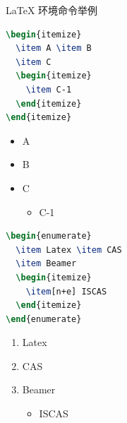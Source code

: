 \documentclass{beamer}
\begin{document}
\begin{frame}[fragile]{\LaTeX{} 环境命令举例}
    \begin{minipage}{0.5\linewidth}
\begin{lstlisting}[language=TeX]
\begin{itemize}
  \item A \item B
  \item C
  \begin{itemize}
    \item C-1
  \end{itemize}
\end{itemize}
\end{lstlisting}
    \end{minipage}\hspace{1cm}
    \begin{minipage}{0.3\linewidth}
        \begin{itemize}
            \item A
            \item B
            \item C
            \begin{itemize}
                \item C-1
            \end{itemize}
        \end{itemize}
    \end{minipage}
    \medskip
    \pause
    \begin{minipage}{0.5\linewidth}
\begin{lstlisting}[language=TeX]
\begin{enumerate}
  \item Latex \item CAS
  \item Beamer
  \begin{itemize}
    \item[n+e] ISCAS
  \end{itemize}
\end{enumerate}
\end{lstlisting}
    \end{minipage}\hspace{1cm}
    \begin{minipage}{0.3\linewidth}
        \begin{enumerate}
            \item Latex
            \item CAS
            \item Beamer
            \begin{itemize}
                \item[n+e] ISCAS
            \end{itemize}
        \end{enumerate}
    \end{minipage}
\end{frame}
\end{document}

